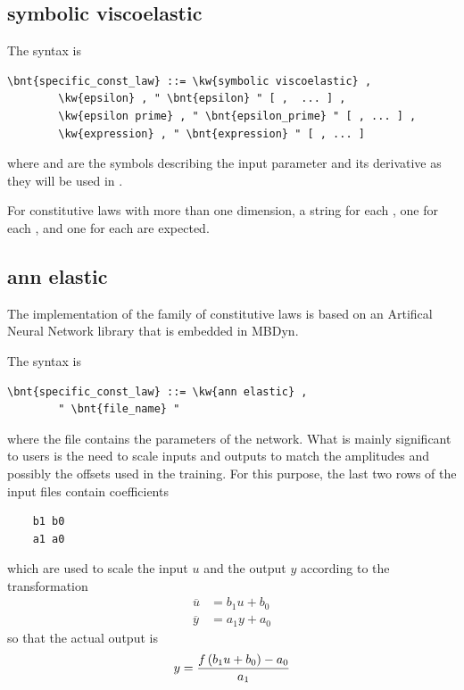 \subsection{symbolic viscoelastic}\label{sec:CL:SYMBOLIC-VISCOELASTIC}
The syntax is
\begin{Verbatim}[commandchars=\\\{\}]
    \bnt{specific_const_law} ::= \kw{symbolic viscoelastic} ,
        \kw{epsilon} , " \bnt{epsilon} " [ ,  ... ] ,
        \kw{epsilon prime} , " \bnt{epsilon_prime} " [ , ... ] ,
        \kw{expression} , " \bnt{expression} " [ , ... ]
\end{Verbatim}
where  and  are the symbols describing 
the input parameter and its derivative as they will be used
in .

For constitutive laws with more than one dimension,
a string for each , one for each ,
and one for each  are expected.

\subsection{ann elastic}\label{sec:CL:ANN-ELASTIC}
The implementation  of the family of  constitutive laws
is based on an Artifical Neural Network library that is embedded in MBDyn.

The syntax is
\begin{Verbatim}[commandchars=\\\{\}]
    \bnt{specific_const_law} ::= \kw{ann elastic} ,
        " \bnt{file_name} "
\end{Verbatim}
where the file  contains the parameters of the network.
What is mainly significant to users is the need to scale inputs and outputs
to match the amplitudes and possibly the offsets used in the training.
For this purpose, the last two rows of the input files contain coefficients
\begin{verbatim}
    b1 b0
    a1 a0
\end{verbatim}
which are used to scale the input $u$ and the output $y$ according
to the transformation
\begin{align}
	\overline{u} &= b_1 u + b_0 \\
	\overline{y} &= a_1 y + a_0
\end{align}
so that the actual output is
\begin{equation}
	y = \frac{f\left( b_1 u + b_0 \right) - a_0}{a_1}
\end{equation}

